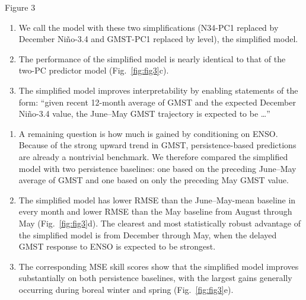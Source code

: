 \documentclass[aspectratio=169,xcolor=dvipsnames]{beamer}
\begin{document}
\begin{frame}{Figure 3}
\begin{enumerate}
  \item We call the model with these two simplifications (N34-PC1
    replaced by December Ni\~no-3.4 and GMST-PC1 replaced by level), the
    simplified model.
    
  \item The performance of the  simplified model is nearly
    identical to that of the two-PC predictor model (Fig.\
    \ref{fig:fig3}c).

  \item The simplified model improves interpretability by enabling
    statements of the form: ``given recent 12-month average of GMST
    and the expected December Ni\~no-3.4 value, the June--May GMST
    trajectory is expected to be \ldots''
  \end{enumerate}

  \begin{enumerate}\fontsize{5pt}{7pt}\selectfont
  \item A remaining question is how much is gained by conditioning on
    ENSO. Because of the strong upward trend in GMST,
    persistence-based predictions are already a nontrivial
    benchmark. We therefore compared the simplified model with two
    persistence baselines: one based on the preceding June--May
    average of GMST and one based on only the preceding May GMST
    value.

  \item The simplified model has lower RMSE than the June--May-mean
    baseline in every month and lower RMSE than the May baseline from
    August through May (Fig.\ \ref{fig:fig3}d). The clearest and most
    statistically robust advantage of the simplified model is from
    December through May, when the delayed GMST response to ENSO is
    expected to be strongest.

  \item The corresponding MSE skill scores show that the simplified
    model improves substantially on both persistence baselines, with
    the largest gains generally occurring during boreal winter and
    spring (Fig.\ \ref{fig:fig3}e).
  
  \end{enumerate}
\end{frame}
\end{document}
